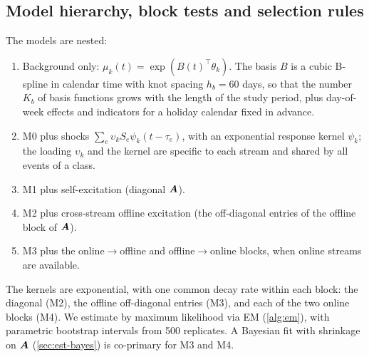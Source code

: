 \subsection{Model hierarchy, block tests and selection rules}\label{sec:plan-models}

The models are nested:
\begin{enumerate}
  \item[M0] Background only: $\mu_k(t)=\exp(B(t)^\top\theta_k)$. The basis
  $B$ is a cubic B-spline in calendar time with knot spacing $h_b=60$ days, so that the
  number $K_b$ of basis functions grows with the length of the study period, plus
  day-of-week effects and indicators for a holiday calendar fixed in advance.
  \item[M1] M0 plus shocks $\sum_e\upsilon_k S_e\psi_k(t-\tau_e)$, with an
  exponential response kernel $\psi_k$; the loading $\upsilon_k$ and the
  kernel are specific to each stream and shared by all events of a class.
  \item[M2] M1 plus self-excitation (diagonal $\bm{A}$).
  \item[M3] M2 plus cross-stream offline excitation (the off-diagonal entries of the
  offline block of $\bm{A}$).
  \item[M4] M3 plus the online$\to$offline and offline$\to$online blocks, when online
  streams are available.
\end{enumerate}
The kernels are exponential, with one common decay rate within each block: the diagonal
(M2), the offline off-diagonal entries (M3), and each of the two online blocks (M4). We
estimate by maximum likelihood via EM (\cref{alg:em}), with parametric bootstrap intervals
from 500 replicates. A Bayesian fit with shrinkage on $\bm{A}$ (\cref{sec:est-bayes}) is
co-primary for M3 and M4.

